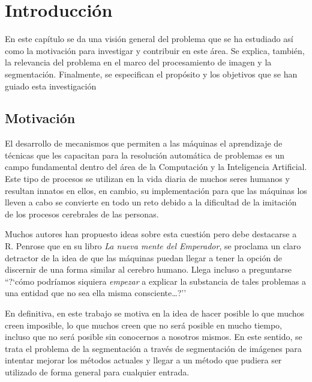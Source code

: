 \chapter{Introducción}

En este capítulo se da una visión general del problema que se ha estudiado así como la motivación para investigar y contribuir en este área. Se explica, también, la relevancia del problema en el marco del procesamiento de imagen y la segmentación. Finalmente, se especifican el propósito y los objetivos que se han guiado esta investigación


\section{Motivación}\label{sec:motivacion}

El desarrollo de mecanismos que permiten a las máquinas el aprendizaje de técnicas que les capacitan para la resolución automática de problemas es un campo fundamental dentro del área de la Computación y la Inteligencia Artificial. Este tipo de procesos se utilizan en la vida diaria de muchos seres humanos y resultan innatos en ellos, en cambio, su implementación para que las máquinas los lleven a cabo se convierte en todo un reto debido a la dificultad de la imitación de los procesos cerebrales de las personas.

Muchos autores \cite{lib:ross, lib:boden, art:searle, art:churchland} han propuesto ideas sobre esta cuestión pero debe destacarse a R. Penrose \cite{lib:penrose} que en su libro {\em La nueva mente del Emperador},  se proclama un claro detractor de la idea de que las máquinas puedan llegar a tener la opción de discernir de una forma similar al cerebro humano. Llega incluso a preguntarse ``?`cómo podríamos siquiera {\em empezar} a explicar la substancia de tales problemas a una entidad que no sea ella misma consciente\dots?''

En definitiva, en este trabajo se motiva en la idea de hacer posible lo que muchos creen imposible, lo que muchos creen que no será posible en mucho tiempo, incluso que no será posible sin conocernos a nosotros mismos. En este sentido, se trata el problema de la segmentación a través de segmentación de imágenes para intentar mejorar los métodos actuales y llegar a un método que pudiera ser utilizado de forma general para cualquier entrada.


